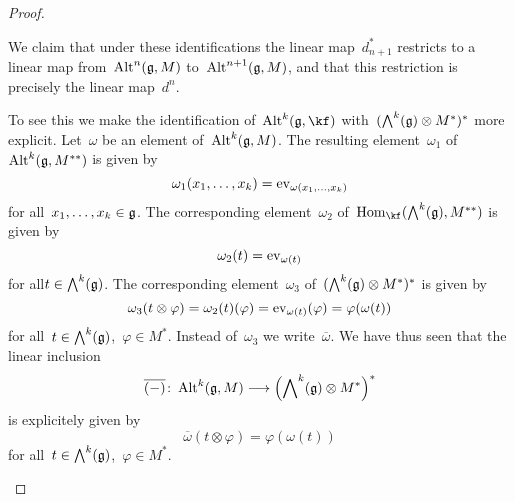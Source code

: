 \begin{proof}
\begin{enumerate}
      We claim that under these identifications the linear map~$d_{n+1}^*$ restricts to a linear map from~$\operatorname{Alt}^n(\mathfrak{g}, M)$ to~$\operatorname{Alt}^{n+1}(\mathfrak{g}, M)$, and that this restriction is precisely the linear map~$d^n$.

      To see this we make the identification of~$\Alt^k(\glie, \kf)$ with~$( \operatorname{\bigwedge}^k(\mathfrak{g}) \otimes M^* )^*$ more explicit.
      Let~$\omega$ be an element of~$\operatorname{Alt}^k(\mathfrak{g}, M)$.
      The resulting element~$\omega_1$ of~$\operatorname{Alt}^k(\mathfrak{g}, M^{**})$ is given by
      \[
        \omega_1(x_1, \dotsc, x_k)
        =
        \operatorname{ev}_{\omega(x_1, \dotsc, x_k)}
      \]
      for all~$x_1, \dotsc, x_k \in \mathfrak{g}$.
      The corresponding element~$\omega_2$ of~$\Hom_{\kf}( \Exterior^k(\glie), M^{**} )$ is given by
      \[
        \omega_2(t)
        =
        \operatorname{ev}_{\omega(t)}
      \]
      for all$t \in \operatorname{\bigwedge}^k(\mathfrak{g})$.
      The corresponding element~$\omega_3$ of~$( \operatorname{\bigwedge}^k(\mathfrak{g}) \otimes M^* )^*$ is given by
      \[
        \omega_3(t \otimes \varphi)
        =
        \omega_2(t)(\varphi)
        =
        \operatorname{ev}_{\omega(t)}(\varphi)
        =
        \varphi(\omega(t))
      \]
      for all~$t \in \operatorname{\bigwedge}^k(\mathfrak{g})$,~$\varphi \in M^*$.
      Instead of~$\omega_3$ we write~$\overline{\omega}$.
      We have thus seen that the linear inclusion
      \[
        \overline{ (-) }
        \colon
        \Alt^k(\glie, M)
        \to
        \Bigl( \Exterior^k(\glie) \otimes M^* \Bigr)^*
      \]
      is explicitely given by
      \[
        \overline{\omega}(t \otimes \varphi)
        =
        \varphi(\omega(t))
      \]
      for all~$t \in \operatorname{\bigwedge}^k(\mathfrak{g})$,~$\varphi \in M^*$.


\end{enumerate}
\end{proof}

